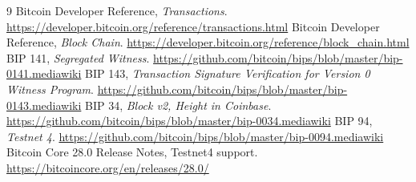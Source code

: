 \documentclass[11pt,a4paper,fontset=none]{ctexart}
\begin{document}
\clearpage
\begin{thebibliography}{9}
 Bitcoin Developer Reference, \emph{Transactions}. \url{https://developer.bitcoin.org/reference/transactions.html}
 Bitcoin Developer Reference, \emph{Block Chain}. \url{https://developer.bitcoin.org/reference/block_chain.html}
 BIP 141, \emph{Segregated Witness}. \url{https://github.com/bitcoin/bips/blob/master/bip-0141.mediawiki}
 BIP 143, \emph{Transaction Signature Verification for Version 0 Witness Program}. \url{https://github.com/bitcoin/bips/blob/master/bip-0143.mediawiki}
 BIP 34, \emph{Block v2, Height in Coinbase}. \url{https://github.com/bitcoin/bips/blob/master/bip-0034.mediawiki}
 BIP 94, \emph{Testnet 4}. \url{https://github.com/bitcoin/bips/blob/master/bip-0094.mediawiki}
 Bitcoin Core 28.0 Release Notes, Testnet4 support. \url{https://bitcoincore.org/en/releases/28.0/}
\end{thebibliography}
\end{document}
